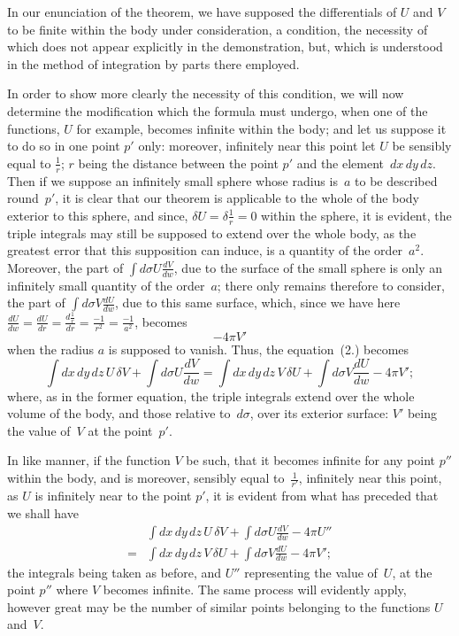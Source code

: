 \documentclass[11pt,notitlepage]{amsart}
\begin{document}
In our enunciation of the theorem, we have supposed the differentials
of $U$ and $V$ to be finite within the body under consideration, a condition,
the necessity of which does not appear explicitly in the demonstration, but,
which is understood in the method of integration by parts there employed.

In order to show more clearly the necessity of this condition, we will
now determine the modification which the formula must undergo, when one
of the functions, $U$ for example, becomes infinite within the body; and let us
suppose it to do so in one point $p'$ only: moreover, infinitely near this point
let $U$ be sensibly equal to $\frac1r$;
$r$ being the distance between the point $p'$ and
the element~$dx\,dy\,dz$. Then if we suppose an
infinitely small sphere whose
radius is~$a$ to be described round~$p'$,
it is clear that our theorem is applicable
to the whole of the body exterior to this sphere, and since,
$\delta U=\delta\frac1r=0$
within the sphere, it is evident, the triple integrals may still be supposed to
extend over the whole body, as the greatest error that this supposition can
induce, is a quantity of the order~$a^2$.
Moreover, the part of $\int d\sigma U\frac{dV}{dw}$, due
to the surface of the small sphere is only an infinitely small quantity of the
order~$a$; there only remains therefore to consider,
the part of $\int d\sigma V\frac{dU}{dw}$, due
to this same surface, which, since we have here
$\frac{dU}{dw}=\frac{dU}{dr}=\frac{d\frac1r}{dr}=\frac{-1}{r^2}=\frac{-1}{a^2}$,
becomes
\[
-4\pi V'
\]
when the radius $a$ is supposed to vanish. Thus, the equation~(2.) becomes
\[
\tag{3.}
\int dx\,dy\,dz\,U\,\delta V+\int d\sigma U \frac{dV}{dw}=
\int dx\,dy\,dz\,V\,\delta U+\int d\sigma V \frac{dU}{dw}-4\pi V';
\]
where, as in the former equation, the triple integrals extend over the whole
volume of the body, and those relative to~$d\sigma$, over its exterior surface:
$V'$ being the value of~$V$ at the point~$p'$.

In like manner, if the function $V$ be such, that it becomes infinite for
any point $p''$ within the body, and is moreover,
sensibly equal to~$\frac{1}{r'}$, infinitely
near this point, as $U$ is infinitely near to the point $p'$, it is evident
from what has preceded that we shall have
\[
\tag{3.'}
\begin{aligned}
&\int dx\,dy\,dz\,U\,\delta V+\int d\sigma U \frac{dV}{dw}-4\pi U''\\
=&\int dx\,dy\,dz\,V\,\delta U+\int d\sigma V \frac{dU}{dw}-4\pi V';
\end{aligned}
\]
the integrals being taken as before,
and $U''$ representing the value of~$U$, at
the point $p''$ where $V$ becomes infinite. The same process will evidently
apply, however great may be the number of similar points belonging to the
functions $U$ and~$V$.
\end{document}
